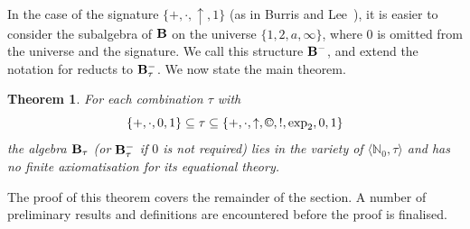 \documentclass[eqnor,reqno]{amsart}
\theoremstyle{plain}
\newtheorem{thm}{Theorem}[section]
\theoremstyle{definition}
\newcommand{\cc}{\mathbin{\textup{\copyright}}}
\newcommand{\up}[1]{\textup{#1}}
\begin{document}
In the case of the signature $\{+,\cdot,\uparrow,1\}$ (as in Burris and Lee~\cite{burlee92}), it is easier to consider the subalgebra of ${\bf B}$ on the universe $\{1,2,a,\infty\}$, where $0$ is omitted from the universe and the signature. 
We call this structure ${\bf B}^-$, and extend the notation for reducts to ${\bf B}_\tau^-$.  
We now state the main theorem.
\begin{thm}\label{thm:main}
For each combination $\tau$ with 
\[
\{+,\cdot,0,1\}\subseteq \tau\subseteq \{+,\cdot,\uparrow,\cc,!,\exp_2,0,1\}
\] 
the algebra ${\bf B}_\tau$ \up(or ${\bf B}_\tau^-$ if $0$ is not required\up) lies in the variety of $\langle \mathbb{N}_0,\tau\rangle$ and has no finite axiomatisation for its equational theory.
\end{thm}
The proof of this theorem covers the remainder of the section.  A number of preliminary results and definitions are encountered before the proof is finalised.
\end{document}
